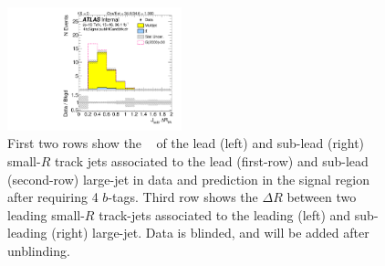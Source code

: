 \begin{figure}[htbp!]
\begin{center}
\includegraphics[width=0.45\textwidth,angle=-90]{figures/boosted/Signal/b77_FourTag_Signal_sublHCand_trk_dr_blind.pdf}
  \caption{First two rows show the \pt~ of the lead (left) and sub-lead (right) small-$R$ track jets associated to the lead (first-row) and sub-lead (second-row) large-\R jet in data and prediction in the signal region after requiring 4 $b$-tags. Third row shows the $\Delta R$ between two leading small-$R$ track-jets associated to the leading (left) and sub-leading (right) large-\R jet. Data is blinded, and will be added after unblinding. }
  \label{fig:boosted-4b-signal-blind-ak2}
\end{center}
\end{figure}


